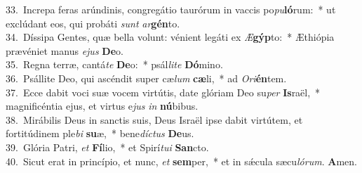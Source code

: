 {33.~}Increpa feras arúndinis, congregátio taurórum in vaccis po\textit{pu}\textbf{ló}rum:~* ut exclúdant eos, qui probáti \textit{sunt} \textit{ar}\textbf{gén}to.\\
{34.~}Díssipa Gentes, quæ bella volunt: vénient legáti ex \textit{Æ}\textbf{gýp}to:~* Æthiópia prævéniet manus \textit{e}\textit{jus} \textbf{De}o.\\
{35.~}Regna terræ, cantá\textit{te} \textbf{De}o:~* psál\textit{li}\textit{te} \textbf{Dó}mino.\\
{36.~}Psállite Deo, qui ascéndit super cæ\textit{lum} \textbf{cæ}li,~* ad \textit{O}\textit{ri}\textbf{én}tem.\\
{37.~}Ecce dabit voci suæ vocem virtútis, date glóriam Deo su\textit{per} \textbf{Is}raël,~* magnificéntia ejus, et virtus e\textit{jus} \textit{in} \textbf{nú}bibus.\\
{38.~}Mirábilis Deus in sanctis suis, Deus Israël ipse dabit virtútem, et fortitúdinem ple\textit{bi} \textbf{su}æ,~* bene\textit{dí}\textit{ctus} \textbf{De}us.\\
{39.~}Glória Patri, \textit{et} \textbf{Fí}lio,~* et Spirí\textit{tu}\textit{i} \textbf{San}cto.\\
{40.~}Sicut erat in princípio, et nunc, \textit{et} \textbf{sem}per,~* et in sǽcula sæcu\textit{ló}\textit{rum}. \textbf{A}men.\\
